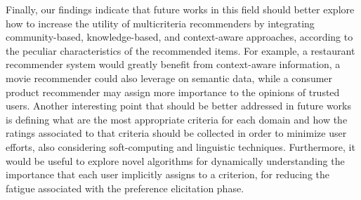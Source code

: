 Finally, our findings indicate that future works in this field should better explore how to increase the utility of multicriteria recommenders by integrating community-based, knowledge-based, and context-aware approaches, according to the peculiar characteristics of the recommended items. For example, a restaurant recommender system would greatly benefit from context-aware information, a movie recommender could also leverage on semantic data, while a consumer product recommender may assign more importance to the opinions of trusted users. Another interesting point that should be better addressed in future works is defining what are the most appropriate criteria for each domain and how the ratings associated to that criteria should be collected in order to minimize user efforts, also considering soft-computing and linguistic techniques. Furthermore, it would be useful to explore novel algorithms for dynamically understanding the importance that each user implicitly assigns to a criterion, for reducing the fatigue associated with the preference elicitation phase.
